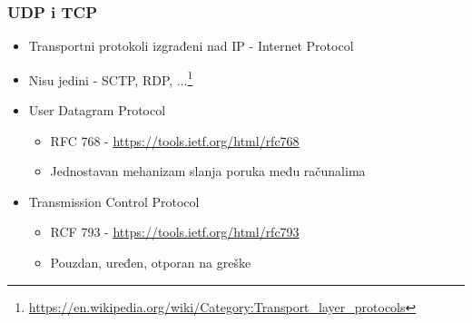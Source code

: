 \documentclass[t]{beamer}
\begin{document}
\begin{frame}
	\frametitle{UDP i TCP}
	\begin{itemize}
	    \item Transportni protokoli izgrađeni nad IP - Internet Protocol
	    \item Nisu jedini - SCTP, RDP, ...\footnote{\url{https://en.wikipedia.org/wiki/Category:Transport_layer_protocols}}
	    \item User Datagram Protocol
	    \begin{itemize}
	        \item RFC 768 - \url{https://tools.ietf.org/html/rfc768}
	        \item Jednostavan mehanizam slanja poruka među računalima
	    \end{itemize}
	    \item Transmission Control Protocol
	    \begin{itemize}
	        \item RCF 793 - \url{https://tools.ietf.org/html/rfc793}
	        \item Pouzdan, uređen, otporan na greške
	    \end{itemize}
    \end{itemize}
\end{frame}
\end{document}
